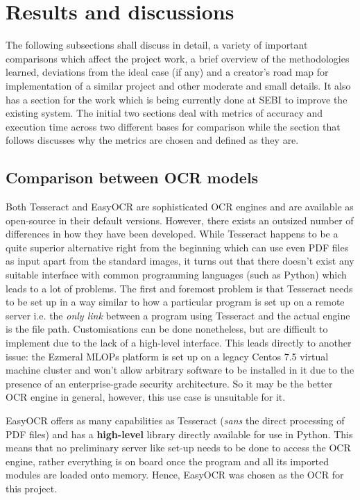 \chapter{Results and discussions} \label{chapter5}

The following subsections shall discuss in detail, a variety of
important comparisons which affect the project work, a brief overview
of the methodologies learned, deviations from the ideal case (if any)
and a creator’s road map for implementation of a similar project and
other moderate and small details. It also has a section for the work
which is being currently done at SEBI to improve the existing system.
The initial two sections deal with metrics of accuracy and execution
time across two different bases for comparison while the section that
follows discusses why the metrics are chosen and defined as they are. \par

\section{Comparison between OCR models} \label{comp_ocr}

Both Tesseract and EasyOCR are sophisticated OCR engines and are
available as open-source in their default versions. However, there
exists an outsized number of differences in how they have been
developed. While Tesseract \cite{Google2015} happens to be a quite
superior alternative right from the beginning which can use even PDF
files as input apart from the standard images, it turns out that
there doesn’t exist any suitable interface with common programming
languages (such as Python) which leads to a lot of problems. The
first and foremost problem is that Tesseract needs to be set up in a
way similar to how a particular program is set up on a remote server
i.e. the \textit{only link} between a program using Tesseract and the
actual engine is the file path. Customisations can be done
nonetheless, but are difficult to implement due to the lack of a
high-level interface. This leads directly to another issue: the
Ezmeral MLOPs platform is set up on a legacy Centos 7.5 virtual
machine cluster and won’t allow arbitrary software to be installed in
it due to the presence of an enterprise-grade security architecture.
So it may be the better OCR engine in general, however, this use case
is unsuitable for it.\par

EasyOCR offers as many capabilities \cite{Jaided2020} as Tesseract
(\textit{sans} the direct processing of PDF files) and has a
\textbf{high-level} library directly available for use in Python.
This means that no preliminary server like set-up needs to be done to
access the OCR engine, rather everything is on board once the program
and all its imported modules are loaded onto memory. Hence, EasyOCR
was chosen as the OCR for this project. \par

